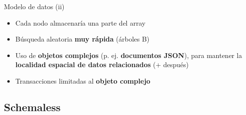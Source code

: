 \begin{frame}
\begin{overlayarea}{\textwidth}{.8\textheight}
{\begin{block}{Modelo de datos (ii)}
\begin{itemize}
\begin{itemize}
\item Cada nodo almacenaría una parte del array
\item Búsqueda aleatoria {\bf muy rápida} (árboles B)
\item Uso de {\bf objetos complejos} (p. ej. {\bf documentos JSON}),
  para mantener la {\bf localidad espacial de datos relacionados} (+
  después)
\item Transacciones limitadas al {\bf objeto complejo}
\end{itemize}
\end{itemize}
\end{block}%
}%
\end{overlayarea}
\end{frame}

\subsection{Schemaless}

